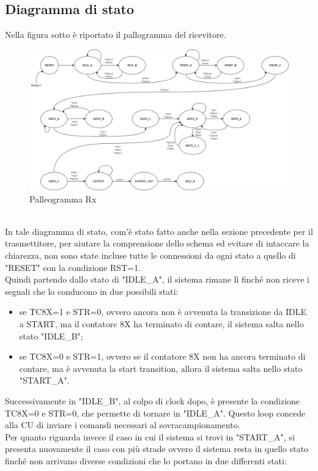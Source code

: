 \documentclass[a4paper, titlepage]{article}
\begin{document}
\subsection{Diagramma di stato}
Nella figura sotto è riportato il pallogramma del ricevitore.
\begin{figure}[!h]
    \centering
    \includegraphics[scale=0.4]{PalleogrammaRXV2 (2).png}
    \caption{Palleogramma Rx}
    \label{fig:Pal-rx}
\end{figure}\\
In tale diagramma di stato, com'è stato fatto anche nella sezione precedente per il trasmettitore, per aiutare la comprensione dello schema ed evitare di intaccare la chiarezza, non sono state incluse tutte le connessioni da ogni stato a quello di "RESET" con la condizione RST=1.\\Quindi partendo dallo stato di "IDLE\_A", il sistema rimane lì finché non riceve i segnali che lo conducono in due possibili stati:
\begin{itemize}
    \item se TC8X=1 e STR=0, ovvero ancora non è avvenuta la transizione da IDLE a START, ma il contatore 8X ha terminato di contare, il sistema salta nello stato "IDLE\_B";
    \item se TC8X=0 e STR=1, ovvero se il contatore 8X non ha ancora terminato di contare, ma è avvenuta la start transition, allora il sistema salta nello stato "START\_A".
\end{itemize}
Successivamente in "IDLE\_B", al colpo di clock dopo, è presente la condizione TC8X=0 e STR=0, che permette di tornare in "IDLE\_A". Questo loop concede alla CU di inviare i comandi necessari al sovracampionamento.\\ Per quanto riguarda invece il caso in cui il sistema si trovi in "START\_A", si presenta nuovamente il caso con più strade ovvero il sistema resta in quello stato finché non arrivano diverse condizioni che lo portano in due differenti stati:
\end{document}
